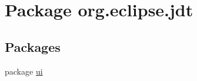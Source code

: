 \hypertarget{namespaceorg_1_1eclipse_1_1jdt}{
\section{Package org.eclipse.jdt}
\label{namespaceorg_1_1eclipse_1_1jdt}
}
\subsection*{Packages}
\begin{DoxyCompactItemize}
\item 
package \hyperlink{namespaceorg_1_1eclipse_1_1jdt_1_1ui}{ui}
\end{DoxyCompactItemize}
